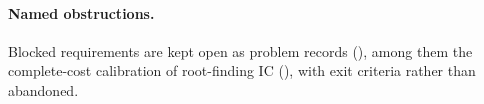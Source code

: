 \paragraph{Named obstructions.} Blocked requirements are kept open as
problem records (), among them the complete-cost
calibration of root-finding IC
(), with exit
criteria rather than abandoned.
